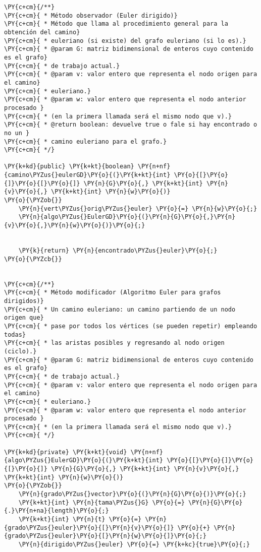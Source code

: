 \begin{Verbatim}[commandchars=\\\{\}]
\PY{c+cm}{/**}
\PY{c+cm}{ * Método observador (Euler dirigido)}
\PY{c+cm}{ * Método que llama al procedimiento general para la obtención del camino}
\PY{c+cm}{ * euleriano (si existe) del grafo euleriano (si lo es).}
\PY{c+cm}{ * @param G: matriz bidimensional de enteros cuyo contenido es el grafo}
\PY{c+cm}{ * de trabajo actual.}
\PY{c+cm}{ * @param v: valor entero que representa el nodo origen para el camino}
\PY{c+cm}{ * euleriano.}
\PY{c+cm}{ * @param w: valor entero que representa el nodo anterior procesado }
\PY{c+cm}{ * (en la primera llamada será el mismo nodo que v).}
\PY{c+cm}{ * @return boolean: devuelve true o fale si hay encontrado o no un }
\PY{c+cm}{ * camino euleriano para el grafo.}
\PY{c+cm}{ */}
    
\PY{k+kd}{public} \PY{k+kt}{boolean} \PY{n+nf}{camino\PYZus{}eulerGD}\PY{o}{(}\PY{k+kt}{int} \PY{o}{[}\PY{o}{]}\PY{o}{[}\PY{o}{]} \PY{n}{G}\PY{o}{,} \PY{k+kt}{int} \PY{n}{v}\PY{o}{,} \PY{k+kt}{int} \PY{n}{w}\PY{o}{)}
\PY{o}{\PYZob{}}
    \PY{n}{vert\PYZus{}orig\PYZus{}euler} \PY{o}{=} \PY{n}{w}\PY{o}{;}
    \PY{n}{algo\PYZus{}EulerGD}\PY{o}{(}\PY{n}{G}\PY{o}{,}\PY{n}{v}\PY{o}{,}\PY{n}{w}\PY{o}{)}\PY{o}{;}
	

    \PY{k}{return} \PY{n}{encontrado\PYZus{}euler}\PY{o}{;}
\PY{o}{\PYZcb{}}


\PY{c+cm}{/**}
\PY{c+cm}{ * Método modificador (Algoritmo Euler para grafos dirigidos)}
\PY{c+cm}{ * Un camino euleriano: un camino partiendo de un nodo origen que}
\PY{c+cm}{ * pase por todos los vértices (se pueden repetir) empleando todas}
\PY{c+cm}{ * las aristas posibles y regresando al nodo origen (ciclo).}
\PY{c+cm}{ * @param G: matriz bidimensional de enteros cuyo contenido es el grafo}
\PY{c+cm}{ * de trabajo actual.}
\PY{c+cm}{ * @param v: valor entero que representa el nodo origen para el camino}
\PY{c+cm}{ * euleriano.}
\PY{c+cm}{ * @param w: valor entero que representa el nodo anterior procesado }
\PY{c+cm}{ * (en la primera llamada será el mismo nodo que v).}
\PY{c+cm}{ */}

\PY{k+kd}{private} \PY{k+kt}{void} \PY{n+nf}{algo\PYZus{}EulerGD}\PY{o}{(}\PY{k+kt}{int} \PY{o}{[}\PY{o}{]}\PY{o}{[}\PY{o}{]} \PY{n}{G}\PY{o}{,} \PY{k+kt}{int} \PY{n}{v}\PY{o}{,} \PY{k+kt}{int} \PY{n}{w}\PY{o}{)}
\PY{o}{\PYZob{}}
    \PY{n}{grado\PYZus{}vector}\PY{o}{(}\PY{n}{G}\PY{o}{)}\PY{o}{;}
    \PY{k+kt}{int} \PY{n}{tama\PYZus{}G} \PY{o}{=} \PY{n}{G}\PY{o}{.}\PY{n+na}{length}\PY{o}{;}
    \PY{k+kt}{int} \PY{n}{t} \PY{o}{=} \PY{n}{grado\PYZus{}euler}\PY{o}{[}\PY{n}{v}\PY{o}{]} \PY{o}{+} \PY{n}{grado\PYZus{}euler}\PY{o}{[}\PY{n}{w}\PY{o}{]}\PY{o}{;}
    \PY{n}{dirigido\PYZus{}euler} \PY{o}{=} \PY{k+kc}{true}\PY{o}{;}


\end{Verbatim}
